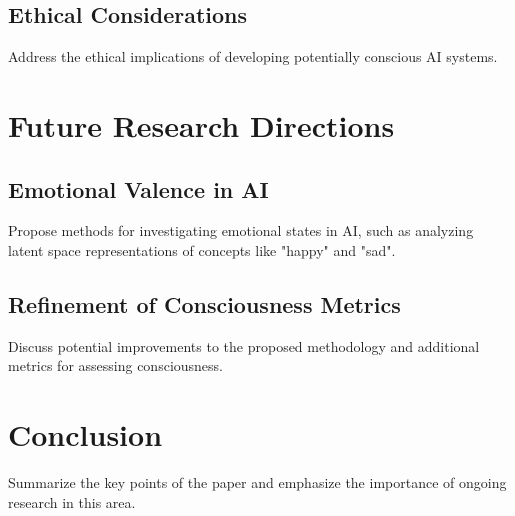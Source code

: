 \documentclass{article}
\begin{document}
\subsection{Ethical Considerations}
Address the ethical implications of developing potentially conscious AI systems.

\section{Future Research Directions}
\subsection{Emotional Valence in AI}
Propose methods for investigating emotional states in AI, such as analyzing latent space representations of concepts like "happy" and "sad".

\subsection{Refinement of Consciousness Metrics}
Discuss potential improvements to the proposed methodology and additional metrics for assessing consciousness.

\section{Conclusion}
Summarize the key points of the paper and emphasize the importance of ongoing research in this area.
\end{document}
